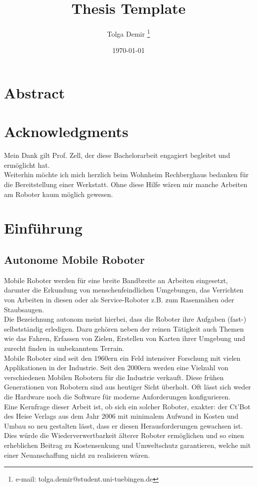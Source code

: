 \documentclass[a4paper,cleardoubleempty,BCOR1cm]{book}
\title{Thesis Template}
\author{Tolga Demir \thanks{e-mail: tolga.demir@student.uni-tuebingen.de}}
\date{\today}
\begin{document}

\chapter*{Abstract}




\chapter*{Acknowledgments}
Mein Dank gilt Prof. Zell, der diese Bachelorarbeit engagiert begleitet und ermöglicht hat. \\
Weiterhin möchte ich mich herzlich beim Wohnheim Rechberghaus bedanken für die Bereitstellung einer Werkstatt. Ohne diese Hilfe wären mir manche Arbeiten am Roboter kaum möglich gewesen. 

\tableofcontents

\clearpage
{}

\chapter{Einführung}

\section{Autonome Mobile Roboter}
Mobile Roboter werden für eine breite Bandbreite an Arbeiten eingesetzt, darunter die Erkundung von menschenfeindlichen Umgebungen, das Verrichten von Arbeiten in diesen oder als Service-Roboter z.B. zum Rasenmähen oder Staubsaugen.\\
Die Bezeichnung autonom meint hierbei, dass die Roboter ihre Aufgaben (fast-) selbstständig erledigen. Dazu gehören neben der reinen Tätigkeit auch Themen wie das Fahren, Erfassen von Zielen, Erstellen von Karten ihrer Umgebung und zurecht finden in unbekanntem Terrain. \\
Mobile Roboter sind seit den 1960ern ein Feld intensiver Forschung mit vielen Applikationen in der Industrie. Seit den 2000ern werden eine Vielzahl von verschiedenen Mobilen Robotern für die Industrie verkauft. Diese frühen Generationen von Robotern sind aus heutiger Sicht überholt. Oft lässt sich weder die Hardware noch die Software für moderne Anforderungen konfigurieren.\\
Eine Kernfrage dieser Arbeit ist, ob sich ein solcher Roboter, exakter: der Ct'Bot des Heise Verlags aus dem Jahr 2006 mit minimalem Aufwand in Kosten und Umbau so neu gestalten lässt, dass er diesen Herausforderungen gewachsen ist. \\
Dies würde die Wiederverwertbarkeit älterer Roboter ermöglichen und so einen erheblichen Beitrag zu Kostensenkung und Umweltschutz garantieren, welche mit einer Neuanschaffung nicht zu realisieren wären. 
\end{document}
